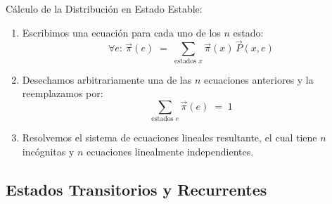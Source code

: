 \documentclass[ 10pt, xcolor = dvipsnames]{beamer}
\begin{document}
\begin{frame}[allowframebreaks]
\frametitle{\insertsubsection}

C\'alculo de la Distribuci\'on en Estado Estable: 
\begin{enumerate}
\item Escribimos una ecuaci\'on para cada uno de los $n$ estado: 
\[
\forall e \colon \, \vec{\pi}(e) \; = \; 
\sum_{\text{estados }x} \vec{\pi}(x) \, \vec{P}(x,e) 
\]
\item Desechamos arbitrariamente una de las $n$ ecuaciones anteriores y la reemplazamos por: 
\[
\sum_{\text{estados }e} \vec{\pi}(e) \; = \; 1
\]
\item Resolvemos el sistema de ecuaciones lineales resultante, el cual tiene \linebreak $n$ inc\'ognitas y $n$ ecuaciones linealmente independientes. 

\end{enumerate}

\end{frame}

\subsection{Estados Transitorios y Recurrentes}
\end{document}
